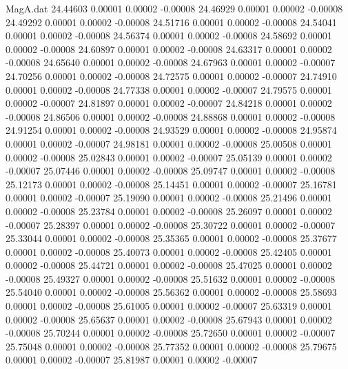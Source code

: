 \begin{filecontents}{MagA.dat}
  24.44603    0.00001    0.00002   -0.00008
  24.46929    0.00001    0.00002   -0.00008
  24.49292    0.00001    0.00002   -0.00008
  24.51716    0.00001    0.00002   -0.00008
  24.54041    0.00001    0.00002   -0.00008
  24.56374    0.00001    0.00002   -0.00008
  24.58692    0.00001    0.00002   -0.00008
  24.60897    0.00001    0.00002   -0.00008
  24.63317    0.00001    0.00002   -0.00008
  24.65640    0.00001    0.00002   -0.00008
  24.67963    0.00001    0.00002   -0.00007
  24.70256    0.00001    0.00002   -0.00008
  24.72575    0.00001    0.00002   -0.00007
  24.74910    0.00001    0.00002   -0.00008
  24.77338    0.00001    0.00002   -0.00007
  24.79575    0.00001    0.00002   -0.00007
  24.81897    0.00001    0.00002   -0.00007
  24.84218    0.00001    0.00002   -0.00008
  24.86506    0.00001    0.00002   -0.00008
  24.88868    0.00001    0.00002   -0.00008
  24.91254    0.00001    0.00002   -0.00008
  24.93529    0.00001    0.00002   -0.00008
  24.95874    0.00001    0.00002   -0.00007
  24.98181    0.00001    0.00002   -0.00008
  25.00508    0.00001    0.00002   -0.00008
  25.02843    0.00001    0.00002   -0.00007
  25.05139    0.00001    0.00002   -0.00007
  25.07446    0.00001    0.00002   -0.00008
  25.09747    0.00001    0.00002   -0.00008
  25.12173    0.00001    0.00002   -0.00008
  25.14451    0.00001    0.00002   -0.00007
  25.16781    0.00001    0.00002   -0.00007
  25.19090    0.00001    0.00002   -0.00008
  25.21496    0.00001    0.00002   -0.00008
  25.23784    0.00001    0.00002   -0.00008
  25.26097    0.00001    0.00002   -0.00007
  25.28397    0.00001    0.00002   -0.00008
  25.30722    0.00001    0.00002   -0.00007
  25.33044    0.00001    0.00002   -0.00008
  25.35365    0.00001    0.00002   -0.00008
  25.37677    0.00001    0.00002   -0.00008
  25.40073    0.00001    0.00002   -0.00008
  25.42405    0.00001    0.00002   -0.00008
  25.44721    0.00001    0.00002   -0.00008
  25.47025    0.00001    0.00002   -0.00008
  25.49327    0.00001    0.00002   -0.00008
  25.51632    0.00001    0.00002   -0.00008
  25.54040    0.00001    0.00002   -0.00008
  25.56362    0.00001    0.00002   -0.00008
  25.58693    0.00001    0.00002   -0.00008
  25.61005    0.00001    0.00002   -0.00007
  25.63319    0.00001    0.00002   -0.00008
  25.65637    0.00001    0.00002   -0.00008
  25.67943    0.00001    0.00002   -0.00008
  25.70244    0.00001    0.00002   -0.00008
  25.72650    0.00001    0.00002   -0.00007
  25.75048    0.00001    0.00002   -0.00008
  25.77352    0.00001    0.00002   -0.00008
  25.79675    0.00001    0.00002   -0.00007
  25.81987    0.00001    0.00002   -0.00007

\end{filecontents}
